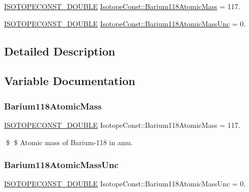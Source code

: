\begin{DoxyCompactItemize}
\item 
\mbox{\hyperlink{group___isotope_const-_macros_ga8f45a7272ce02c0b4c65c44636ed719a}{I\+S\+O\+T\+O\+P\+E\+C\+O\+N\+S\+T\+\_\+\+D\+O\+U\+B\+LE}} \mbox{\hyperlink{group___isotope_const-_barium-_ba118_ga8075e8309c372c501180d81aeec436e0}{Isotope\+Const\+::\+Barium118\+Atomic\+Mass}} = 117.
\item 
\mbox{\hyperlink{group___isotope_const-_macros_ga8f45a7272ce02c0b4c65c44636ed719a}{I\+S\+O\+T\+O\+P\+E\+C\+O\+N\+S\+T\+\_\+\+D\+O\+U\+B\+LE}} \mbox{\hyperlink{group___isotope_const-_barium-_ba118_ga1da163854fd1bb50753ec7c0c62991d4}{Isotope\+Const\+::\+Barium118\+Atomic\+Mass\+Unc}} = 0.
\end{DoxyCompactItemize}


\subsection{Detailed Description}


\subsection{Variable Documentation}
\mbox{\label{group___isotope_const-_barium-_ba118_ga8075e8309c372c501180d81aeec436e0}} 
\subsubsection{\texorpdfstring{Barium118\+Atomic\+Mass}{Barium118AtomicMass}}
{\footnotesize\ttfamily \mbox{\hyperlink{group___isotope_const-_macros_ga8f45a7272ce02c0b4c65c44636ed719a}{I\+S\+O\+T\+O\+P\+E\+C\+O\+N\+S\+T\+\_\+\+D\+O\+U\+B\+LE}} Isotope\+Const\+::\+Barium118\+Atomic\+Mass = 117.}

\$ \$ Atomic mass of Barium-\/118 in amu. \mbox{\label{group___isotope_const-_barium-_ba118_ga1da163854fd1bb50753ec7c0c62991d4}} 
\subsubsection{\texorpdfstring{Barium118\+Atomic\+Mass\+Unc}{Barium118AtomicMassUnc}}
{\footnotesize\ttfamily \mbox{\hyperlink{group___isotope_const-_macros_ga8f45a7272ce02c0b4c65c44636ed719a}{I\+S\+O\+T\+O\+P\+E\+C\+O\+N\+S\+T\+\_\+\+D\+O\+U\+B\+LE}} Isotope\+Const\+::\+Barium118\+Atomic\+Mass\+Unc = 0.}

